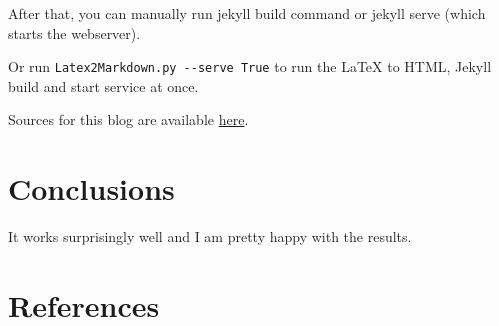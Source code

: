 \documentclass{article}
\begin{document}
After that, you can manually run jekyll build command or jekyll serve (which starts the webserver).

Or run \lstinline{Latex2Markdown.py --serve True} to run the LaTeX to HTML, Jekyll build and start service at once.

Sources for this blog are available \href{https://github.com/gabrielcarvfer/gabrielcarvfer.github.io}{here}.

\section{Conclusions}\label{conclusions}
It works surprisingly well and I am pretty happy with the results.

\section{References}


\end{document}
